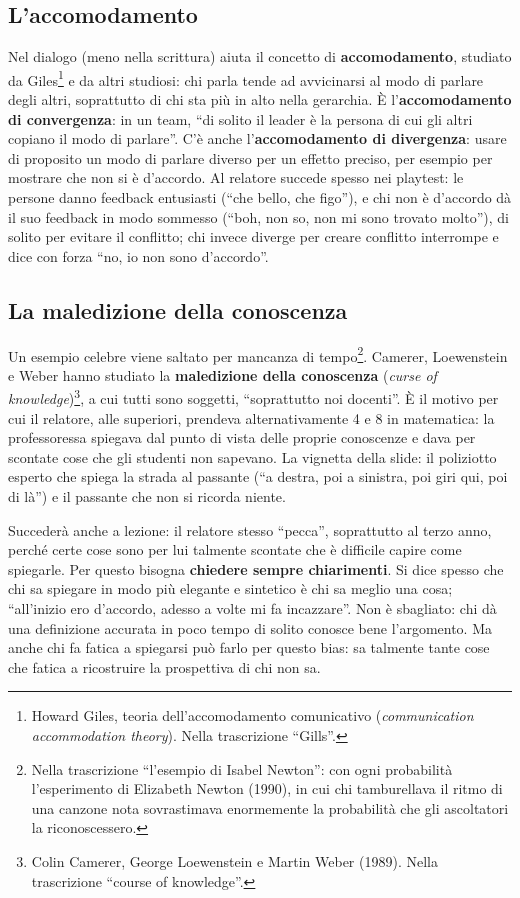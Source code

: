\subsection{L'accomodamento}

Nel dialogo (meno nella scrittura) aiuta il concetto di
\textbf{accomodamento}, studiato da Giles\footnote{Howard Giles, teoria
dell'accomodamento comunicativo (\emph{communication accommodation theory}).
Nella trascrizione ``Gills''.} e da altri studiosi: chi parla tende ad avvicinarsi al
modo di parlare degli altri, soprattutto di chi sta più in alto nella gerarchia.
È l'\textbf{accomodamento di convergenza}: in un team, ``di solito il leader è
la persona di cui gli altri copiano il modo di parlare''. C'è anche
l'\textbf{accomodamento di divergenza}: usare di proposito un modo di parlare
diverso per un effetto preciso, per esempio per mostrare che non si è
d'accordo. Al relatore succede spesso nei playtest: le persone danno feedback
entusiasti (``che bello, che figo''), e chi non è d'accordo dà il suo feedback in
modo sommesso (``boh, non so, non mi sono trovato molto''), di solito per
evitare il conflitto; chi invece diverge per creare conflitto interrompe e dice
con forza ``no, io non sono d'accordo''.

\subsection{La maledizione della conoscenza}

Un esempio celebre viene saltato per mancanza di tempo\footnote{Nella
trascrizione ``l'esempio di Isabel Newton'': con ogni probabilità
l'esperimento di Elizabeth Newton (1990), in cui chi tamburellava il ritmo di
una canzone nota sovrastimava enormemente la probabilità che gli ascoltatori
la riconoscessero.}. Camerer, Loewenstein e Weber hanno studiato la
\textbf{maledizione della conoscenza} (\emph{curse of knowledge})\footnote{Colin
Camerer, George Loewenstein e Martin Weber (1989). Nella trascrizione ``course
of knowledge''.}, a cui tutti sono soggetti, ``soprattutto noi docenti''. È il
motivo per cui il relatore, alle superiori, prendeva alternativamente 4 e 8 in
matematica: la professoressa spiegava dal punto di vista delle proprie
conoscenze e dava per scontate cose che gli studenti non sapevano. La vignetta
della slide: il poliziotto esperto che spiega la strada al passante
(``a destra, poi a sinistra, poi giri qui, poi di là'') e il passante che non si
ricorda niente.

Succederà anche a lezione: il relatore stesso ``pecca'', soprattutto al terzo
anno, perché certe cose sono per lui talmente scontate che è difficile capire
come spiegarle. Per questo bisogna \textbf{chiedere sempre chiarimenti}. Si dice
spesso che chi sa spiegare in modo più elegante e sintetico è chi sa meglio una
cosa; ``all'inizio ero d'accordo, adesso a volte mi fa incazzare''. Non è
sbagliato: chi dà una definizione accurata in poco tempo di solito conosce bene
l'argomento. Ma anche chi fa fatica a spiegarsi può farlo per questo bias: sa
talmente tante cose che fatica a ricostruire la prospettiva di chi non sa.

